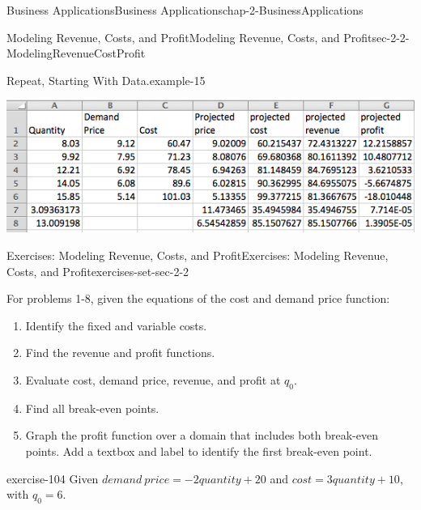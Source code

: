 \documentclass[oneside,10pt,]{book}
\numberwithin{equation}{section}
\begin{document}
\begin{chapterptx}{Business Applications}{}{Business Applications}{}{}{chap-2-BusinessApplications}
\begin{sectionptx}{Modeling Revenue, Costs, and Profit}{}{Modeling Revenue, Costs, and Profit}{}{}{sec-2-2-ModelingRevenueCostProfit}
\begin{example}{Repeat, Starting With Data.}{example-15}
\begin{sidebyside}{1}{0.1}{0.1}{0}%
\begin{sbspanel}{0.8}%
\includegraphics[width=1\linewidth]{images/sec2-2-10.png}
\end{sbspanel}%
\end{sidebyside}%
\end{example}
%
%
\typeout{************************************************}
\typeout{************************************************}
%
\begin{exercises-subsection-numberless}{Exercises: Modeling Revenue, Costs, and Profit}{}{Exercises: Modeling Revenue, Costs, and Profit}{}{}{exercises-set-sec-2-2}
\par\medskip\noindent%
\hypertarget{exercisegroup-7}{}%
\hypertarget{p-679}{}%
For problems 1-8, given the equations of the cost and demand price function:%
\leavevmode%
\begin{enumerate}[label=(\alph*)]
\item\hypertarget{li-191}{}\hypertarget{p-680}{}%
Identify the fixed and variable costs.%
\item\hypertarget{li-192}{}\hypertarget{p-681}{}%
Find the revenue and profit functions.%
\item\hypertarget{li-193}{}\hypertarget{p-682}{}%
Evaluate cost, demand price, revenue, and profit at \(q_0\).%
\item\hypertarget{li-194}{}\hypertarget{p-683}{}%
Find all break-even points.%
\item\hypertarget{li-195}{}\hypertarget{p-684}{}%
Graph the profit function over a domain that includes both break-even points.  Add a textbox and label to identify the first break-even point.%
\end{enumerate}
\begin{exercisegroup}
\begin{divisionexerciseeg}{1}{}{}{exercise-104}%
\hypertarget{p-685}{}%
Given \(demand\ price=-2 quantity+20\) and \(cost=3 quantity+10\), with \(q_0=6\).%
\par\smallskip%

\end{divisionexerciseeg}
\end{exercisegroup}
\end{exercises-subsection-numberless}
\end{sectionptx}
\end{chapterptx}
\end{document}
